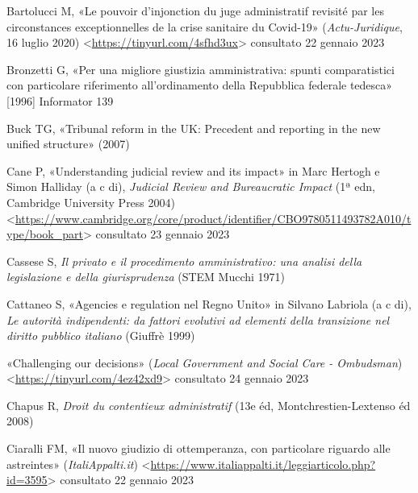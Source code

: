 \documentclass[12pt,it,a4paper,]{report}
\newlength{\cslhangindent}
\newenvironment{CSLReferences}[2] %
 {%
  \setlength{\parindent}{0pt}
  \ifodd #1 \everypar{\setlength{\hangindent}{\cslhangindent}}\ignorespaces\fi
  \ifnum #2 > 0
  \setlength{\parskip}{#2\baselineskip}
  \fi
 }%
 {}
\begin{document}
\hypertarget{refs}{}
\begin{CSLReferences}{0}{0}
\leavevmode{}%
Bartolucci M, {«Le pouvoir d'injonction du juge administratif revisité
par les circonstances exceptionnelles de la crise sanitaire du
Covid-19»} (\emph{Actu-Juridique}, 16 luglio 2020)
\textless{}\url{https://tinyurl.com/4sfhd3ux}\textgreater{} consultato
22 gennaio 2023

\leavevmode{}%
Bronzetti G, {«Per una migliore giustizia amministrativa: spunti
comparatistici con particolare riferimento all'ordinamento della
Repubblica federale tedesca»} {[}1996{]} Informator 139

\leavevmode{}%
Buck TG, {«Tribunal reform in the UK: Precedent and reporting in the new
unified structure»} (2007)

\leavevmode{}%
Cane P, {«Understanding judicial review and its impact»} in Marc Hertogh
e Simon Halliday (a c di), \emph{Judicial Review and Bureaucratic
Impact} (1ª edn, Cambridge University Press 2004)
\textless{}\url{https://www.cambridge.org/core/product/identifier/CBO9780511493782A010/type/book_part}\textgreater{}
consultato 23 gennaio 2023

\leavevmode{}%
Cassese S, \emph{Il privato e il procedimento amministrativo: una
analisi della legislazione e della giurisprudenza} (STEM Mucchi 1971)

\leavevmode{}%
Cattaneo S, {«Agencies e regulation nel Regno Unito»} in Silvano
Labriola (a c di), \emph{Le autorità indipendenti: da fattori evolutivi
ad elementi della transizione nel diritto pubblico italiano} (Giuffrè
1999)

\leavevmode{}%
{«Challenging our decisions»} (\emph{Local Government and Social Care -
Ombudsman}) \textless{}\url{https://tinyurl.com/4ez42xd9}\textgreater{}
consultato 24 gennaio 2023

\leavevmode{}%
Chapus R, \emph{Droit du contentieux administratif} (13e éd,
Montchrestien-Lextenso éd 2008)

\leavevmode{}%
Ciaralli FM, {«Il nuovo giudizio di ottemperanza, con particolare
riguardo alle astreintes»} (\emph{ItaliAppalti.it})
\textless{}\url{https://www.italiappalti.it/leggiarticolo.php?id=3595}\textgreater{}
consultato 22 gennaio 2023


\end{CSLReferences}
\end{document}
